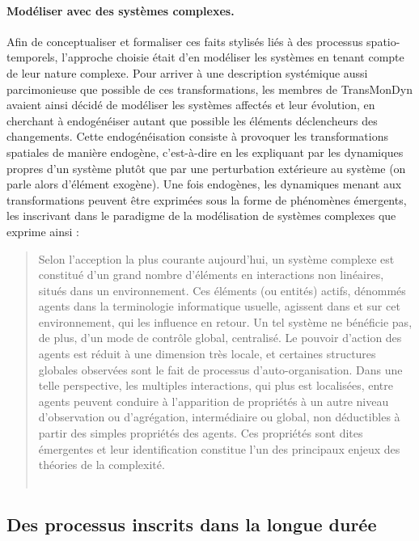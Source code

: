 \paragraph{Modéliser avec des systèmes complexes.}
Afin de conceptualiser et formaliser ces faits stylisés liés à des processus spatio-temporels, l'approche choisie était d'en modéliser les systèmes en tenant compte de leur nature complexe.
Pour arriver à une description systémique aussi parcimonieuse que possible de ces transformations, les membres de TransMonDyn avaient ainsi décidé de modéliser les systèmes affectés et leur évolution, en cherchant à \og endogénéiser\fg{} autant que possible les éléments déclencheurs des changements.
Cette endogénéisation consiste à provoquer les transformations spatiales de manière endogène, c'est-à-dire en les expliquant par les dynamiques propres d'un système plutôt que par une perturbation extérieure au système (on parle alors d'élément exogène).
Une fois endogènes, les dynamiques menant aux transformations peuvent être exprimées sous la forme de phénomènes émergents, les inscrivant dans le paradigme de la modélisation de systèmes complexes que  exprime ainsi :
\begin{quotation}
\noindent \og Selon l’acception la plus courante aujourd’hui, un système complexe est constitué d’un grand nombre d’éléments en interactions non linéaires, situés dans un environnement.
Ces éléments (ou entités) actifs, dénommés agents dans la terminologie informatique usuelle, agissent dans et sur cet environnement, qui les influence en retour.
Un tel système ne bénéficie pas, de plus, d’un mode de contrôle global, centralisé.
Le pouvoir d’action des agents est réduit à une dimension très locale, et certaines structures globales observées sont le fait de processus d’auto-­organisation.
Dans une telle perspective, les multiples interactions, qui plus est localisées, entre agents peuvent conduire à l’apparition de propriétés à un autre niveau d’observation ou d’agrégation, intermédiaire ou global, non déductibles à partir des simples propriétés des agents.
Ces propriétés sont dites émergentes et leur identification constitue l’un des principaux enjeux des théories de la complexité. 
\fg{}\\
\mbox{}~ \hfill \cite[39-40]{banos_pour_2013}  	
  
\end{quotation}

\subsection{Des processus inscrits dans la longue durée}


